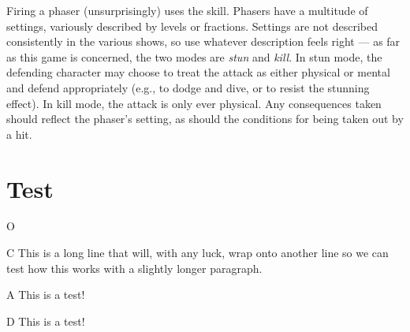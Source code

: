 \documentclass[12pt,titlepage,openany]{book}
\begin{document}
Firing a phaser (unsurprisingly) uses the  skill. Phasers have a
multitude of settings, variously described by levels or fractions. Settings are
not described consistently in the various \StarTrek{} shows, so use whatever
description feels right --- as far as this game is concerned, the two modes are
\emph{stun} and \emph{kill}. In stun mode, the defending character may choose
to treat the attack as either physical or mental and defend appropriately
(e.g.,  to dodge and dive, or  to resist the
stunning effect). In kill mode, the attack is only ever physical. Any
consequences taken should reflect the phaser's setting, as should the
conditions for being taken out by a hit.

\chapter{Test}

\begin{NewSkillAction}{O}
    \lipsum[1]

    \lipsum[2]
\end{NewSkillAction}

\begin{NewSkillAction}{C}
    This is a long line that will, with any luck, wrap onto another line so we
    can test how this works with a slightly longer paragraph.
\end{NewSkillAction}

\begin{NewSkillAction}[+]{A}
    This is a test!
\end{NewSkillAction}

\begin{NewSkillAction}[+]{D}
    This is a test!
\end{NewSkillAction}
\end{document}
